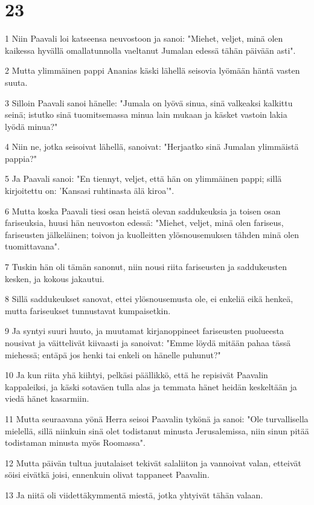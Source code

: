 \chapter{23}

\par 1 Niin Paavali loi katseensa neuvostoon ja sanoi: "Miehet, veljet, minä olen kaikessa hyvällä omallatunnolla vaeltanut Jumalan edessä tähän päivään asti".
\par 2 Mutta ylimmäinen pappi Ananias käski lähellä seisovia lyömään häntä vasten suuta.
\par 3 Silloin Paavali sanoi hänelle: "Jumala on lyövä sinua, sinä valkeaksi kalkittu seinä; istutko sinä tuomitsemassa minua lain mukaan ja käsket vastoin lakia lyödä minua?"
\par 4 Niin ne, jotka seisoivat lähellä, sanoivat: "Herjaatko sinä Jumalan ylimmäistä pappia?"
\par 5 Ja Paavali sanoi: "En tiennyt, veljet, että hän on ylimmäinen pappi; sillä kirjoitettu on: 'Kansasi ruhtinasta älä kiroa'".
\par 6 Mutta koska Paavali tiesi osan heistä olevan saddukeuksia ja toisen osan fariseuksia, huusi hän neuvoston edessä: "Miehet, veljet, minä olen fariseus, fariseusten jälkeläinen; toivon ja kuolleitten ylösnousemuksen tähden minä olen tuomittavana".
\par 7 Tuskin hän oli tämän sanonut, niin nousi riita fariseusten ja saddukeusten kesken, ja kokous jakautui.
\par 8 Sillä saddukeukset sanovat, ettei ylösnousemusta ole, ei enkeliä eikä henkeä, mutta fariseukset tunnustavat kumpaisetkin.
\par 9 Ja syntyi suuri huuto, ja muutamat kirjanoppineet fariseusten puolueesta nousivat ja väittelivät kiivaasti ja sanoivat: "Emme löydä mitään pahaa tässä miehessä; entäpä jos henki tai enkeli on hänelle puhunut?"
\par 10 Ja kun riita yhä kiihtyi, pelkäsi päällikkö, että he repisivät Paavalin kappaleiksi, ja käski sotaväen tulla alas ja temmata hänet heidän keskeltään ja viedä hänet kasarmiin.
\par 11 Mutta seuraavana yönä Herra seisoi Paavalin tykönä ja sanoi: "Ole turvallisella mielellä, sillä niinkuin sinä olet todistanut minusta Jerusalemissa, niin sinun pitää todistaman minusta myös Roomassa".
\par 12 Mutta päivän tultua juutalaiset tekivät salaliiton ja vannoivat valan, etteivät söisi eivätkä joisi, ennenkuin olivat tappaneet Paavalin.
\par 13 Ja niitä oli viidettäkymmentä miestä, jotka yhtyivät tähän valaan.

